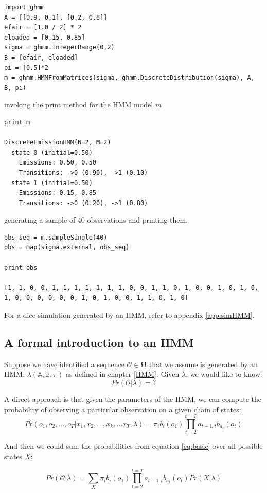 \documentclass[a4paper,12pt]{article}
\theoremstyle{definition}
\begin{document}
\begin{lstlisting}
import ghmm
A = [[0.9, 0.1], [0.2, 0.8]]
efair = [1.0 / 2] * 2
eloaded = [0.15, 0.85]
sigma = ghmm.IntegerRange(0,2)
B = [efair, eloaded]
pi = [0.5]*2
m = ghmm.HMMFromMatrices(sigma, ghmm.DiscreteDistribution(sigma), A, B, pi)
\end{lstlisting}
invoking the print method for the HMM model $m$
\begin{lstlisting}
print m

DiscreteEmissionHMM(N=2, M=2)
  state 0 (initial=0.50)
    Emissions: 0.50, 0.50
    Transitions: ->0 (0.90), ->1 (0.10)
  state 1 (initial=0.50)
    Emissions: 0.15, 0.85
    Transitions: ->0 (0.20), ->1 (0.80)
\end{lstlisting}
generating a sample of 40 observations and printing them.
\begin{lstlisting}
obs_seq = m.sampleSingle(40)
obs = map(sigma.external, obs_seq)

print obs

[1, 1, 0, 0, 1, 1, 1, 1, 1, 1, 1, 0, 0, 1, 1, 0, 1, 0, 0, 1, 0, 1, 0, 1, 0, 0, 0, 0, 0, 0, 1, 0, 1, 0, 0, 1, 1, 0, 1, 0]
\end{lstlisting}

For a dice simulation generated by an HMM, refer to appendix \ref{app:simHMM}.




\subsection{A formal introduction to an HMM}
Suppose we have identified a sequence $\mathcal{O} \in \mathbf{\Omega}$ that we assume is generated by an HMM: $\lambda(\mathbb{A},\mathbb{B},\pi)$ as defined in chapter \ref{HMM}. 
Given $\lambda$, we would like to know:
$$Pr(\mathcal{O}|\lambda)=? $$

A direct approach is that given the parameters of the HMM, we can compute the probability of observing a particular observation on a given chain of states:
\begin{equation}\label{eq:basic}
Pr\left(o_1,o_2,...,o_{T} |x_1,x_2,...,x_k,...x_T, \lambda \right)=  \pi_i b_i(o_1) \prod_{t=2}^{t=T} a_{t-1,t}b_{a_t}(o_t)
\end{equation}

And then we could sum the probabilities from equation \ref{eq:basic} over all possible states $X$:

\begin{equation}\label{eq:directApproach}
Pr\left(\mathcal{O} | \lambda \right)= \sum_X  \pi_i b_i(o_1) \prod_{t=2}^{t=T} a_{t-1,t}b_{a_t}(o_t) Pr(X|\lambda)
\end{equation}
\end{document}
